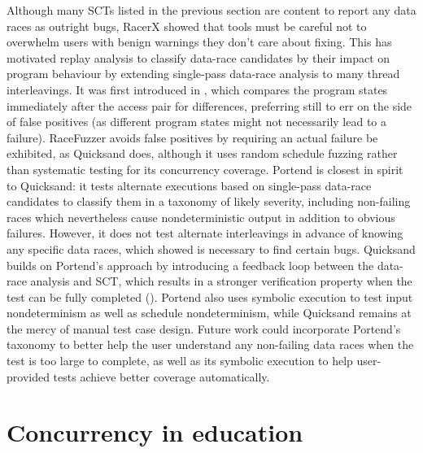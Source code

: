 Although many SCTs listed in the previous section are content to report any data races as outright bugs,
RacerX \cite{racerx} showed that tools must be careful not to overwhelm users with benign warnings
they don't care about fixing.
This has motivated replay analysis
to classify data-race candidates by their impact on program behaviour
by extending single-pass data-race analysis to many thread interleavings.
It was first introduced in \cite{recordreplaydrs},
which compares the program states immediately after the access pair for differences,
preferring still to err on the side of false positives (as different program states might not necessarily lead to a failure).
RaceFuzzer \cite{racefuzzer} avoids false positives by requiring an actual failure be exhibited, as Quicksand does,
although it uses random schedule fuzzing rather than systematic testing for its concurrency coverage.
%
Portend \cite{portend} is closest in spirit to Quicksand:
it tests alternate executions based on single-pass data-race candidates to classify them in a taxonomy of likely severity,
including non-failing races which nevertheless cause nondeterministic output
in addition to obvious failures.
However, it does not
test alternate interleavings in advance of knowing any specific data races,
which \sect{\ref{sec:quicksand-eval}} showed is necessary to find certain bugs.
Quicksand builds on Portend's approach by introducing a feedback loop between the data-race analysis and SCT,
which results in a stronger verification property
when the test can be fully completed (\sect{\ref{sec:quicksand-soundness}}).
Portend also uses symbolic execution to test input nondeterminism as well as schedule nondeterminism,
while Quicksand remains at the mercy of manual test case design.
Future work could incorporate Portend's taxonomy to better help the user understand any non-failing data races
when the test is too large to complete,
as well as its symbolic execution to help user-provided tests achieve better coverage automatically.


\section{Concurrency in education}

